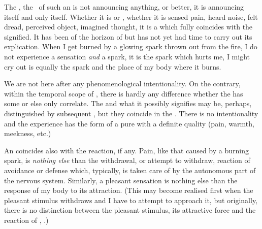 
\label{sub:originalSigns1}
The , the \os\ of such an  is not 
announcing anything, or better, it is announcing itself and only itself. 
Whether it is  or , 
whether it is sensed pain, heard noise, felt dread, perceived object, imagined 
thought, it is a  which fully coincides with the signified. 
It has been  of the horizon of  but 
 has not yet had time to carry out its  
explication. When I get burned by a glowing spark thrown out from the 
fire, I do not experience a sensation {\em and} a spark, it is the 
spark which hurts me, I might cry out 
 is equally the spark and the place of my body where it burns. 

We are not here after any phenomenological intentionality. On the 
contrary, within the temporal scope of 
, there is hardly any difference whether the  
has some  or else only  correlate. The 
 and what it possibly signifies
may be, perhaps, distinguished by subsequent , 
but they coincide in the . There is no 
intentionality and the experience has the form of a pure  
with a definite quality (pain, warmth, meekness, etc.)

\pa An  coincides also with the reaction, if any.  Pain, like
that caused by a burning spark, is {\em nothing else} than the 
withdrawal, or attempt to withdraw, reaction of avoidance or defense which,
typically, is taken care of by the autonomous part of the nervous system.
Similarly, a pleasant sensation is nothing else than the response of my body to
its attraction. (This may become  realised first when
the pleasant stimulus withdraws and I have to attempt to approach it, but
originally, there is no distinction between the pleasant stimulus, its
attractive force and the reaction of , .)

